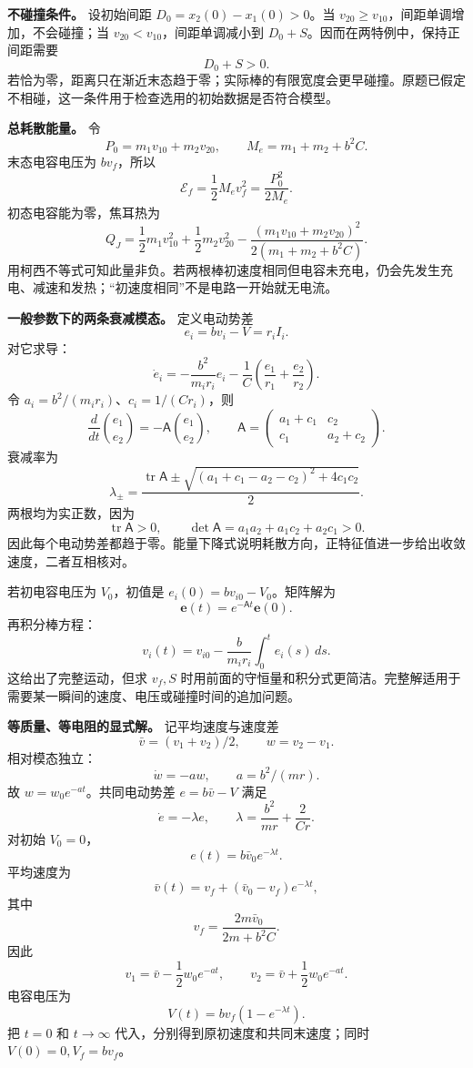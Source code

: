 \documentclass[12pt,a4paper,UTF8]{ctexart}
\begin{document}
\textbf{不碰撞条件。} 设初始间距 \(D_0=x_2(0)-x_1(0)>0\)。当
\(v_{20}\ge v_{10}\)，间距单调增加，不会碰撞；当
\(v_{20}<v_{10}\)，间距单调减小到
\(D_0+S\)。因而在两特例中，保持正间距需要 \[
\boxed{D_0+S>0}.
\]
若恰为零，距离只在渐近末态趋于零；实际棒的有限宽度会更早碰撞。原题已假定不相碰，这一条件用于检查选用的初始数据是否符合模型。

\textbf{总耗散能量。} 令 \[
P_0=m_1v_{10}+m_2v_{20},\qquad
M_e=m_1+m_2+b^2C.
\] 末态电容电压为 \(bv_f\)，所以 \[
\mathcal E_f=\frac12M_ev_f^2=\frac{P_0^2}{2M_e}.
\] 初态电容能为零，焦耳热为 \[
\boxed{Q_J=
\frac12m_1v_{10}^2+\frac12m_2v_{20}^2
-\frac{(m_1v_{10}+m_2v_{20})^2}{2(m_1+m_2+b^2C)}}.
\]
用柯西不等式可知此量非负。若两根棒初速度相同但电容未充电，仍会先发生充电、减速和发热；``初速度相同''不是电路一开始就无电流。

\textbf{一般参数下的两条衰减模态。} 定义电动势差 \[
e_i=bv_i-V=r_iI_i.
\] 对它求导： \[
\dot e_i=-\frac{b^2}{m_ir_i}e_i
-\frac1C\left(\frac{e_1}{r_1}+\frac{e_2}{r_2}\right).
\] 令 \(a_i=b^2/(m_ir_i)\)、\(c_i=1/(Cr_i)\)，则 \[
\frac d{dt}\binom{e_1}{e_2}
=-\mathsf A\binom{e_1}{e_2},\qquad
\mathsf A=
\begin{pmatrix}
a_1+c_1&c_2\\
c_1&a_2+c_2
\end{pmatrix}.
\] 衰减率为 \[
\lambda_\pm=
\frac{\operatorname{tr}\mathsf A
\pm\sqrt{(a_1+c_1-a_2-c_2)^2+4c_1c_2}}2.
\] 两根均为实正数，因为 \[
\operatorname{tr}\mathsf A>0,\qquad
\det\mathsf A=a_1a_2+a_1c_2+a_2c_1>0.
\]
因此每个电动势差都趋于零。能量下降式说明耗散方向，正特征值进一步给出收敛速度，二者互相核对。

若初电容电压为 \(V_0\)，初值是 \(e_i(0)=bv_{i0}-V_0\)。矩阵解为 \[
\boldsymbol e(t)=e^{-\mathsf A t}\boldsymbol e(0).
\] 再积分棒方程： \[
v_i(t)=v_{i0}-\frac b{m_ir_i}\int_0^te_i(s)\,ds.
\] 这给出了完整运动，但求 \(v_f,S\)
时用前面的守恒量和积分式更简洁。完整解适用于需要某一瞬间的速度、电压或碰撞时间的追加问题。

\textbf{等质量、等电阻的显式解。} 记平均速度与速度差 \[
\bar v=(v_1+v_2)/2,\qquad w=v_2-v_1.
\] 相对模态独立： \[
\dot w=-a w,\qquad a=b^2/(mr).
\] 故 \(w=w_0e^{-at}\)。共同电动势差 \(e=b\bar v-V\) 满足 \[
\dot e=-\lambda e,\qquad
\lambda=\frac{b^2}{mr}+\frac2{Cr}.
\] 对初始 \(V_0=0\)， \[
e(t)=b\bar v_0e^{-\lambda t}.
\] 平均速度为 \[
\bar v(t)=v_f+(\bar v_0-v_f)e^{-\lambda t},
\] 其中 \[
v_f=\frac{2m\bar v_0}{2m+b^2C}.
\] 因此 \[
v_1=\bar v-\frac12w_0e^{-at},\qquad
v_2=\bar v+\frac12w_0e^{-at}.
\] 电容电压为 \[
V(t)=bv_f(1-e^{-\lambda t}).
\] 把 \(t=0\) 和 \(t\to\infty\) 代入，分别得到原初速度和共同末速度；同时
\(V(0)=0,V_f=bv_f\)。
\end{document}
